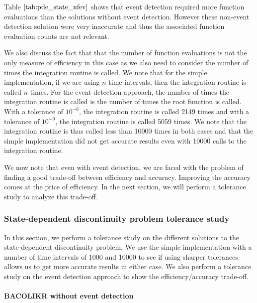 \documentclass{article}
\begin{document}
Table $\ref{tab:pde_state_nfev}$ shows that event detection required more function evaluations than the solutions without event detection. However these non-event detection solution were very inaccurate and thus the associated function evaluation counts are not relevant. 

We also discuss the fact that that the number of function evaluations is not the only measure of efficiency in this case as we also need to consider the number of times the integration routine is called. We note that for the simple implementation, if we are using $n$ time intervals, then the integration routine is called $n$ times. For the event detection approach, the number of times the integration routine is called is the number of times the root function is called. With a tolerance of $10^{-6}$, the integration routine is called 2149 times and with a tolerance of $10^{-9}$, the integration routine is called 5059 times. We note that the integration routine is thus called less than 10000 times in both cases and that the simple implementation did not get accurate results even with 10000 calls to the integration routine.

We now note that even with event detection, we are faced with the problem of finding a good trade-off between efficiency and accuracy. Improving the accuracy comes at the price of efficiency. In the next section, we will perform a tolerance study to analyze this trade-off.

\subsubsection{State-dependent discontinuity problem tolerance study}
\label{subsubsection:pde_state_tol_study}
In this section, we perform a tolerance study on the different solutions to the state-dependent discontinuity problem. We use the simple implementation with a number of time intervals of 1000 and 10000 to see if using sharper tolerances allows us to get more accurate results in either case. We also perform a tolerance study on the event detection approach to show the efficiency/accuracy trade-off.

\paragraph{BACOLIKR without event detection}
\end{document}
